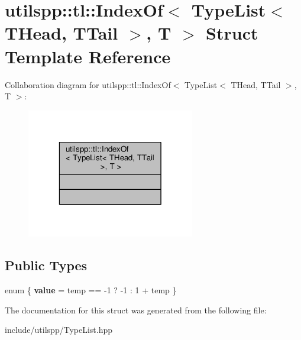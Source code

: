 \hypertarget{structutilspp_1_1tl_1_1IndexOf_3_01TypeList_3_01THead_00_01TTail_01_4_00_01T_01_4}{\section{utilspp\-:\-:tl\-:\-:Index\-Of$<$ Type\-List$<$ T\-Head, T\-Tail $>$, T $>$ Struct Template Reference}
\label{structutilspp_1_1tl_1_1IndexOf_3_01TypeList_3_01THead_00_01TTail_01_4_00_01T_01_4}
}


Collaboration diagram for utilspp\-:\-:tl\-:\-:Index\-Of$<$ Type\-List$<$ T\-Head, T\-Tail $>$, T $>$\-:
\nopagebreak
\begin{figure}[H]
\begin{center}
\leavevmode
\includegraphics[width=208pt]{structutilspp_1_1tl_1_1IndexOf_3_01TypeList_3_01THead_00_01TTail_01_4_00_01T_01_4__coll__graph}
\end{center}
\end{figure}
\subsection*{Public Types}
\begin{DoxyCompactItemize}
\item 
enum \{ {\bfseries value} = temp == -\/1 ? -\/1 \-: 1 + temp
 \}
\end{DoxyCompactItemize}


The documentation for this struct was generated from the following file\-:\begin{DoxyCompactItemize}
\item 
include/utilspp/Type\-List.\-hpp\end{DoxyCompactItemize}
